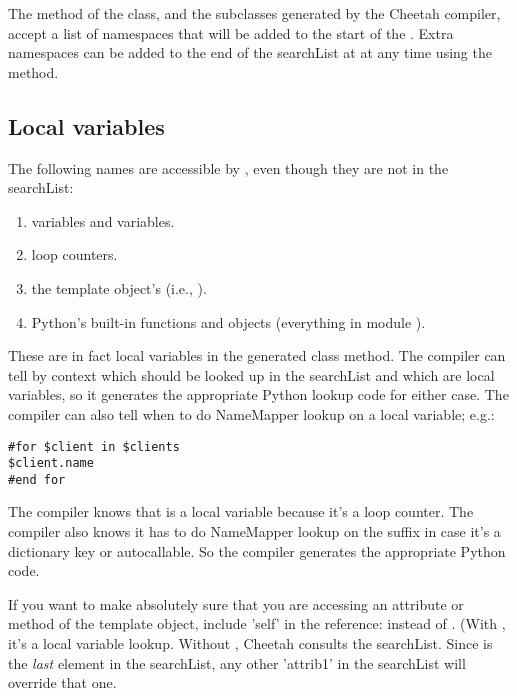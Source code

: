The method of the  class, and the subclasses
generated by the Cheetah compiler, accept a list of namespaces that will be
added to the start of the .  Extra namespaces can be added to
the end of the searchList at at any time using the
 method.



\subsection{Local variables}
\label{language.namemapper.localVariables}

The following names are accessible by , even though they
are not in the searchList:  

\begin{enumerate}
\item {} variables and  variables.
\item {} loop counters.
\item the template object's  (i.e., ).
\item Python's built-in functions and objects (everything in module
     ).
\end{enumerate}

These are in fact local variables in the generated class method.  The compiler
can tell by context which  should be looked up in the
searchList and which are local variables, so it generates the appropriate
Python lookup code for either case.  The compiler can also tell when to do
NameMapper lookup on a local variable; e.g.:
\begin{verbatim}
#for $client in $clients 
$client.name
#end for
\end{verbatim}
The compiler knows that  is a local variable because it's a
 loop counter.  The compiler also knows it has to do NameMapper
lookup on the  suffix in case it's a dictionary key or 
autocallable.  So the compiler generates the appropriate Python code.

If you want to make absolutely sure that you are accessing an attribute or
method of the template object, include 'self' in the reference:
 instead of .  (With , it's
a local variable lookup.  Without , Cheetah consults the 
searchList.  Since  is the {\em last} element in the searchList,
any other 'attrib1' in the searchList will override that one.

